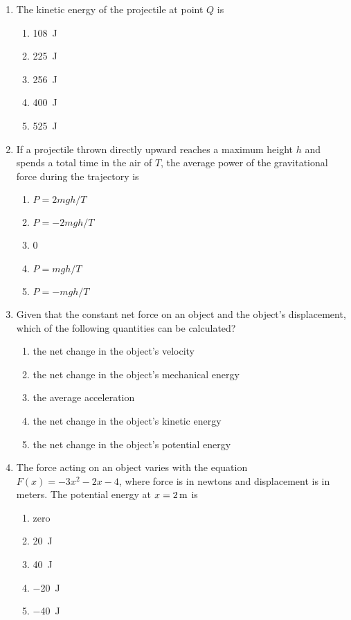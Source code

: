 \documentclass{../../../oss-apphys}
\begin{document}
\begin{multicols}{2}
\begin{enumerate}[leftmargin=18pt,resume]
  \item The kinetic energy of the projectile at point $Q$ is
    \label{q:pq2}
    \begin{enumerate}[nosep,leftmargin=18pt,label=(\Alph*)]
    \item\SI{108}{\joule}
    \item\SI{225}{\joule}
    \item\SI{256}{\joule}
    \item\SI{400}{\joule}
    \item\SI{525}{\joule}
    \end{enumerate}
    \columnbreak
    
  \item If a projectile thrown directly upward reaches a maximum height $h$ and
    spends a total time in the air of $T$, the average power of the
    gravitational force during the trajectory is
    \begin{enumerate}[nosep,leftmargin=18pt,label=(\Alph*)]
    \item $P=2mgh/T$
    \item $P=-2mgh/T$
    \item 0
    \item $P=mgh/T$
    \item $P=-mgh/T$
    \end{enumerate}

  \item Given that the constant net force on an object and the object's 
    displacement, which of the following quantities can be calculated?
    \begin{enumerate}[nosep,leftmargin=18pt,label=(\Alph*)]
    \item the net change in the object's velocity
    \item the net change in the object's mechanical energy
    \item the average acceleration
    \item the net change in the object's kinetic energy
    \item the net change in the object's potential energy
    \end{enumerate}
    \vspace{.5in}
    
  \item The force acting on an object varies with the equation
    $F(x)=-3x^2-2x-4$, where force is in newtons and displacement is in meters.
    The potential energy at $x=\SI2{\metre}$ is
    \begin{enumerate}[nosep,leftmargin=18pt,label=(\Alph*)]
    \item zero
    \item\SI{20}{\joule}
    \item\SI{40}{\joule}
    \item\SI{-20}{\joule}
    \item\SI{-40}{\joule}
    \end{enumerate}
    

\end{enumerate}
\end{multicols}
\end{document}
